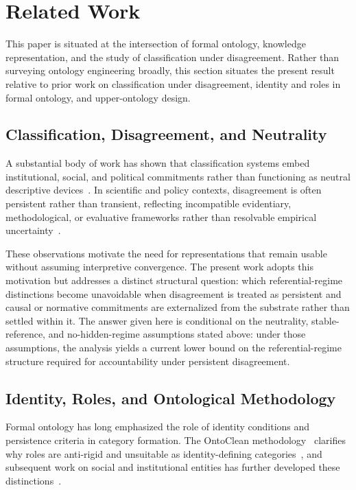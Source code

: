 
\section{Related Work}
\label{sec:related}

This paper is situated at the intersection of formal ontology, knowledge
representation, and the study of classification under disagreement.
Rather than surveying ontology engineering broadly, this section situates the
present result relative to prior work on
classification under disagreement, identity and roles in formal ontology,
and upper-ontology design.

\subsection{Classification, Disagreement, and Neutrality}

A substantial body of work has shown that classification systems embed
institutional, social, and political commitments rather than functioning
as neutral descriptive devices~\citep{bowker1999sorting,haslanger2012resisting}.
In scientific and policy contexts, disagreement is often persistent rather
than transient, reflecting incompatible evidentiary, methodological, or
evaluative frameworks rather than resolvable empirical uncertainty~\citep{longino1990science}.

These observations motivate the need for representations that remain usable
without assuming interpretive convergence.
The present work adopts this motivation but addresses a distinct structural
question: which referential-regime distinctions become unavoidable when
disagreement is treated as persistent and causal or normative commitments
are externalized from the substrate rather than settled within it.
The answer given here is conditional on the neutrality, stable-reference,
and no-hidden-regime assumptions stated above: under those assumptions,
the analysis yields a current lower bound on the referential-regime structure
required for accountability under persistent disagreement.


\subsection{Identity, Roles, and Ontological Methodology}

Formal ontology has long emphasized the role of identity conditions and
persistence criteria in category formation.
The OntoClean methodology~\citep{guarino2002evaluating} clarifies why roles are
anti-rigid and unsuitable as identity-defining categories~\citep{guarino1998roles},
and subsequent work on social and institutional entities has further
developed these distinctions~\citep{masolo2003wonderweb}.

